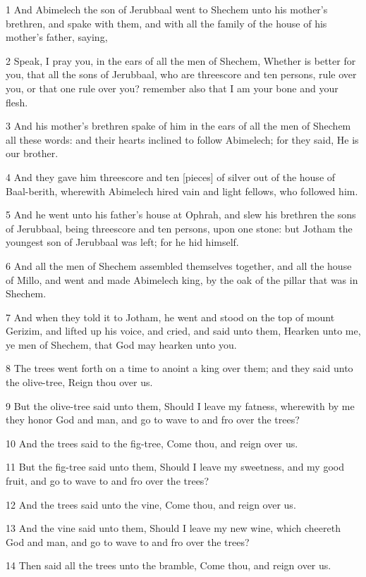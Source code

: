 \par 1 And Abimelech the son of Jerubbaal went to Shechem unto his mother's brethren, and spake with them, and with all the family of the house of his mother's father, saying,
\par 2 Speak, I pray you, in the ears of all the men of Shechem, Whether is better for you, that all the sons of Jerubbaal, who are threescore and ten persons, rule over you, or that one rule over you? remember also that I am your bone and your flesh.
\par 3 And his mother's brethren spake of him in the ears of all the men of Shechem all these words: and their hearts inclined to follow Abimelech; for they said, He is our brother.
\par 4 And they gave him threescore and ten [pieces] of silver out of the house of Baal-berith, wherewith Abimelech hired vain and light fellows, who followed him.
\par 5 And he went unto his father's house at Ophrah, and slew his brethren the sons of Jerubbaal, being threescore and ten persons, upon one stone: but Jotham the youngest son of Jerubbaal was left; for he hid himself.
\par 6 And all the men of Shechem assembled themselves together, and all the house of Millo, and went and made Abimelech king, by the oak of the pillar that was in Shechem.
\par 7 And when they told it to Jotham, he went and stood on the top of mount Gerizim, and lifted up his voice, and cried, and said unto them, Hearken unto me, ye men of Shechem, that God may hearken unto you.
\par 8 The trees went forth on a time to anoint a king over them; and they said unto the olive-tree, Reign thou over us.
\par 9 But the olive-tree said unto them, Should I leave my fatness, wherewith by me they honor God and man, and go to wave to and fro over the trees?
\par 10 And the trees said to the fig-tree, Come thou, and reign over us.
\par 11 But the fig-tree said unto them, Should I leave my sweetness, and my good fruit, and go to wave to and fro over the trees?
\par 12 And the trees said unto the vine, Come thou, and reign over us.
\par 13 And the vine said unto them, Should I leave my new wine, which cheereth God and man, and go to wave to and fro over the trees?
\par 14 Then said all the trees unto the bramble, Come thou, and reign over us.
